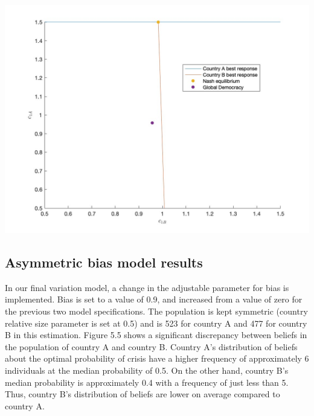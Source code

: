\documentclass[11pt,preprint, authoryear]{elsarticle}
\let\origfigure\figure
\let\endorigfigure\endfigure
\renewenvironment{figure}[1][2] {
    \expandafter\origfigure\expandafter[H]
} {
    \endorigfigure
}
\numberwithin{equation}{section}
\numberwithin{figure}{section}
\numberwithin{table}{section}
\begin{document}
\begin{figure}[H]

{\centering \includegraphics[width=0.75\linewidth]{images/Fig2_0.1Size0Bias} 

}

\caption{Best response functions for asymmetric country size model compared to global democracy}\label{fig:Fig 5.4}
\end{figure}

\hypertarget{asymmetric-bias-model-results}{%
\subsection{Asymmetric bias model
results}\label{asymmetric-bias-model-results}}

In our final variation model, a change in the adjustable parameter for
bias is implemented. Bias is set to a value of 0.9, and increased from a
value of zero for the previous two model specifications. The population
is kept symmetric (country relative size parameter is set at 0.5) and is
523 for country A and 477 for country B in this estimation. Figure 5.5
shows a significant discrepancy between beliefs in the population of
country A and country B. Country A's distribution of beliefs about the
optimal probability of crisis have a higher frequency of approximately 6
individuals at the median probability of 0.5. On the other hand, country
B's median probability is approximately 0.4 with a frequency of just
less than 5. Thus, country B's distribution of beliefs are lower on
average compared to country A.
\end{document}
